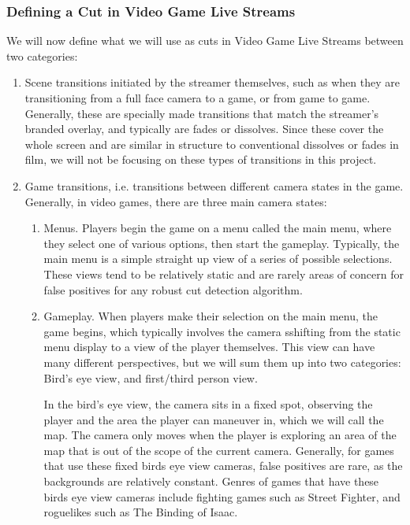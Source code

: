 \documentclass[12pt]{article}
\begin{document}
\subsubsection{Defining a Cut in Video Game Live Streams}
We will now define what we will use as cuts in Video Game Live Streams between two categories:
\begin{enumerate}
    \item Scene transitions initiated by the streamer themselves, such as when they are transitioning from a full face camera to a game, or from game to game. Generally, 
    these are specially made transitions that match the streamer's branded overlay, and typically are fades or dissolves. Since these cover the whole screen and are 
    similar in structure to conventional dissolves or fades in film, we will not be focusing on these types of transitions in this project.
    \item Game transitions, i.e. transitions between different camera states in the game. Generally, in video games, there are three main camera states:
    \begin{enumerate}
        \item Menus. Players begin the game on a menu called the main menu, where they select one of various options, then start the gameplay. Typically, the main menu
        is a simple straight up view of a series of possible selections. These views tend to be relatively static and are rarely areas of concern for false positives for 
        any robust cut detection algorithm.
        \item Gameplay. When players make their selection on the main menu, the game begins, which typically involves the camera sshifting from the static menu display to a 
        view of the player themselves. This view can have many different perspectives, but we will sum them up into two categories: Bird's eye view, and first/third person view.
        
        In the bird's eye view, the camera sits in a fixed spot, observing the player and the area the player can maneuver in, which we will call the map. The camera only 
        moves when the player is exploring an area of the map that is out of the scope of the current camera. Generally, for games that use these fixed birds eye view 
        cameras, false positives are rare, as the backgrounds are relatively constant. Genres of games that have these birds eye view cameras include fighting games such as Street Fighter, 
        and roguelikes such as The Binding of Isaac. 


\end{enumerate}
\end{enumerate}
\end{document}
